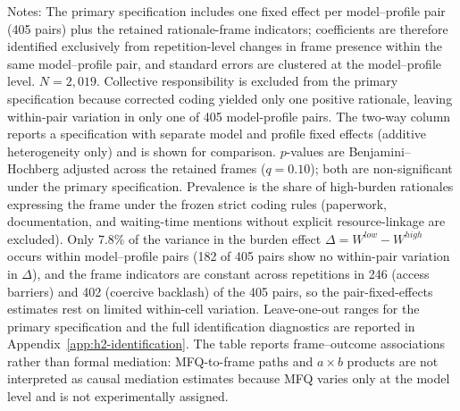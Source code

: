 \documentclass[12pt,a4paper]{article}
\begin{document}
\begin{table}[htbp]
\centering
\caption{Narrative frame--outcome associations under model-by-profile pair fixed effects}
\label{tab:h2_frame_decomposition}
\begin{flushleft}
\footnotesize Notes: The primary specification includes one fixed effect per model--profile pair (405 pairs) plus the retained rationale-frame indicators; coefficients are therefore identified exclusively from repetition-level changes in frame presence within the same model--profile pair, and standard errors are clustered at the model--profile level. \(N=2{,}019\). Collective responsibility is excluded from the primary specification because corrected coding yielded only one positive rationale, leaving within-pair variation in only one of 405 model-profile pairs. The two-way column reports a specification with separate model and profile fixed effects (additive heterogeneity only) and is shown for comparison. \(p\)-values are Benjamini--Hochberg adjusted across the retained frames (\(q=0.10\)); both are non-significant under the primary specification. Prevalence is the share of high-burden rationales expressing the frame under the frozen strict coding rules (paperwork, documentation, and waiting-time mentions without explicit resource-linkage are excluded). Only 7.8\% of the variance in the burden effect \(\Delta = W^{low} - W^{high}\) occurs within model--profile pairs (182 of 405 pairs show no within-pair variation in \(\Delta\)), and the frame indicators are constant across repetitions in 246 (access barriers) and 402 (coercive backlash) of the 405 pairs, so the pair-fixed-effects estimates rest on limited within-cell variation. Leave-one-out ranges for the primary specification and the full identification diagnostics are reported in Appendix~\ref{app:h2-identification}. The table reports frame--outcome associations rather than formal mediation: MFQ-to-frame paths and \(a \times b\) products are not interpreted as causal mediation estimates because MFQ varies only at the model level and is not experimentally assigned.
\end{flushleft}
\end{table}
\end{document}
